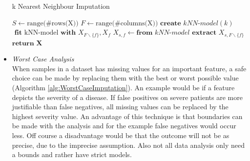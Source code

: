 \documentclass[10pt,a4paper]{article}
\begin{document}
\begin{itemize}
		\begin{algorithm}[H]
			\caption{k Nearest Neighbour Imputation}\label{alg:kNNImputation}
			\begin{algorithmic}[1]
				\State $S \gets \text{range(\#rows(X))}$ 	
				\State $F \gets \text{range(\#columns(X))}$ 	
				 					
				 				 			
				\State $\textbf{create } \textit{kNN-model}(k)$	
				\State $\textbf{ fit } \text{kNN-model} \textbf{ with } X_{F \backslash\{f\}}, X_f$	
				 
				 
				\State $X_{s,f} \gets \textbf{from } \textit{kNN-model} \textbf{ extract } X_{s, F \backslash \{f\}}$ 
				\EndIf
				\EndFor
				\EndIf
				\EndFor
				\State $\textbf{return X}$
				\EndProcedure
			\end{algorithmic}
		\end{algorithm}	
		
		\item \textit{Worst Case Analysis} \\
		When samples in a dataset has missing values for an important feature, a safe choice can be made by replacing them with the best or worst possible value (Algorithm \ref{alg:WorstCaseImputation}). An example would be if a feature depicts the severity of a disease. If false positives on severe patients are more justifiable than false negatives, all missing values can be replaced by the highest severity value. An advantage of this technique is that boundaries can be made with the analysis and for the example false negatives would occur less. Off course a disadvantage would be that the outcome will not be as precise, due to the imprecise assumption. Also not all data analysis only need a bounds and rather have strict models\cite{pedersen2017missing, haukoos2007advanced}.
		

\end{itemize}
\end{document}
